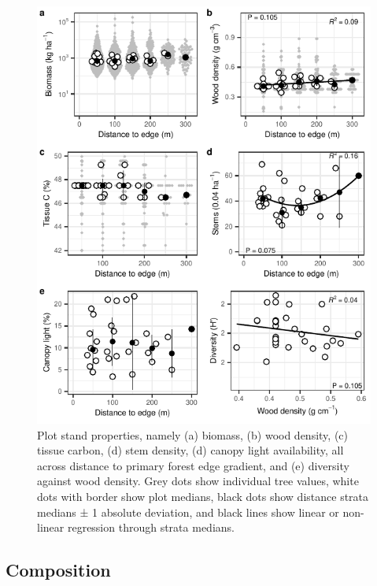 \documentclass[
  12pt,
]{article}
\begin{document}
\begin{figure}
\centering
\includegraphics{merge_files/figure-latex/biomass-1.pdf}
\caption{\label{fig:biomass} Plot stand properties, namely (a) biomass, (b) wood density, (c) tissue carbon, (d) stem density, (d) canopy light availability, all across distance to primary forest edge gradient, and (e) diversity against wood density. Grey dots show individual tree values, white dots with border show plot medians, black dots show distance strata medians ± 1 absolute deviation, and black lines show linear or non-linear regression through strata medians.}
\end{figure}

\hypertarget{composition}{%
\subsection{Composition}\label{composition}}
\end{document}

